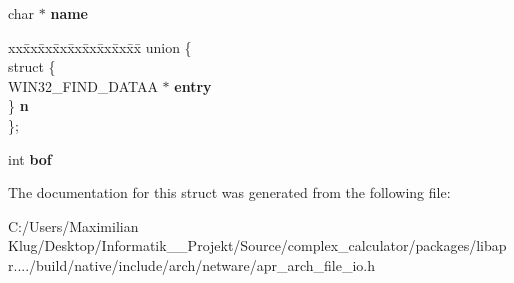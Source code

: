 \begin{DoxyCompactItemize}
\item 
\mbox{\label{structapr__dir__t_a32bbf12a97448197d0a3b3b20455493b}} 
char $\ast$ {\bfseries name}
\item 
\mbox{\label{structapr__dir__t_a47cb3342a49a5e45ff2b524097a3bda0}} 
\begin{tabbing}
xx\=xx\=xx\=xx\=xx\=xx\=xx\=xx\=xx\=\kill
union \{\\
\>struct \{\\
\>\>WIN32\_FIND\_DATAA $\ast$ {\bfseries entry}\\
\>\} {\bfseries n}\\
\}; \\

\end{tabbing}\item 
\mbox{\label{structapr__dir__t_ac5b544b98e43e25420377d322b49e67c}} 
int {\bfseries bof}
\end{DoxyCompactItemize}


The documentation for this struct was generated from the following file\+:\begin{DoxyCompactItemize}
\item 
C\+:/\+Users/\+Maximilian Klug/\+Desktop/\+Informatik\+\_\+\_\+\+Projekt/\+Source/complex\+\_\+calculator/packages/libapr..../build/native/include/arch/netware/apr\+\_\+arch\+\_\+file\+\_\+io.\+h\end{DoxyCompactItemize}
